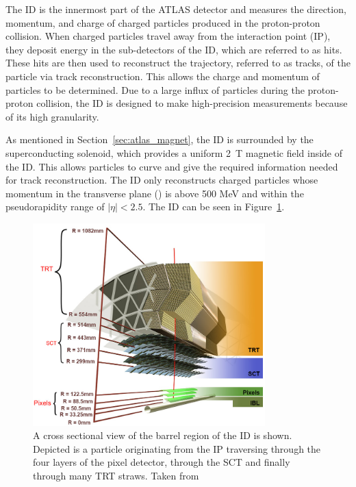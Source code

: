 The ID is the innermost part of the ATLAS detector and measures the direction, momentum, and charge of charged particles produced in the proton-proton collision. When charged particles travel away from the interaction point (IP), they deposit energy in the sub-detectors of the ID, which are referred to as hits. These hits are then used to reconstruct the trajectory, referred to as tracks, of the particle via track reconstruction. This allows the charge and momentum of particles to be determined. Due to a large influx of particles during the proton-proton collision, the ID is designed to make high-precision measurements because of its high granularity. 

As mentioned in Section~\ref{sec:atlas_magnet}, the ID is surrounded by the superconducting solenoid, which provides a uniform 2~T magnetic field inside of the ID\@. This allows particles to curve and give the required information needed for track reconstruction. The ID only reconstructs charged particles whose momentum in the transverse plane (\pt) is above 500 MeV and within the pseudorapidity range of $|\eta| < 2.5$. The ID can be seen in Figure~\ref{fig:atlas_id}.

\begin{figure}
    \centering
    \includegraphics[width=0.8\textwidth]{figures/atlas/atlas_ID.png}
    \caption{A cross sectional view of the barrel region of the ID is shown. Depicted is a particle originating from the IP traversing through the four layers of the pixel detector, through the SCT and finally through many TRT straws. Taken from~\cite{atlas_inner_detector_image}}\label{fig:atlas_id}
\end{figure}

